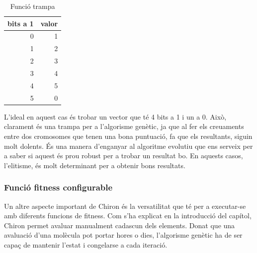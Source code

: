 
\begin{table}
\centering
\caption{Funció trampa}
\begin{tabular}{|r|r|}
\hline
\multicolumn{1}{|c|}{\textbf{bits a 1 }} & \multicolumn{1}{c|}{\textbf{ valor}} \\
\hline
\hline
0 & 1 \\
1 & 2 \\
2 & 3 \\
3 & 4 \\
4 & 5 \\
5 & 0 \\
\hline
\end{tabular}
\end{table}


L'ideal en aquest cas és trobar un vector que té 4 bits a 1 i un a 0.  Això,
clarament és una trampa per a l'algorisme genètic, ja que al fer els creuaments
entre dos cromosomes que tenen una bona puntuació, fa que els resultants, siguin
molt dolents. És una manera d'enganyar al algoritme evolutiu que ens serveix per
a saber si aquest és prou robust per a trobar un resultat bo.  En aquests casos,
l'elitisme, és molt determinant per a obtenir bons resultats.

\subsubsection{Funció fitness configurable} %
\label{ssub:Funcio fitness configurable}

Un altre aspecte important de Chiron és la versatilitat que té per a executar-se
amb diferents funcions de fitness.  Com s'ha explicat en la introducció del
capítol, Chiron permet avaluar manualment cadascun dels elements.  Donat que una
avaluació d'una molècula pot portar hores o dies, l'algorisme genètic ha de ser
capaç de mantenir l'estat i congelarse a cada iteració.


